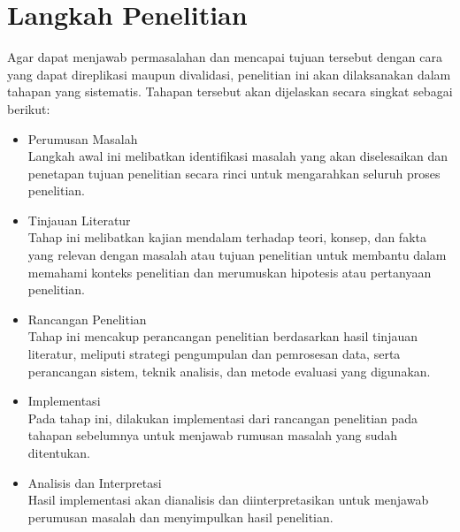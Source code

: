 \section{Langkah Penelitian}
\label{subbab:1:Langkah Penelitian}
Agar dapat menjawab permasalahan dan mencapai tujuan tersebut dengan cara yang dapat direplikasi maupun divalidasi, penelitian ini akan dilaksanakan dalam tahapan yang sistematis. Tahapan tersebut akan dijelaskan secara singkat sebagai berikut:
\begin{itemize}
    \item Perumusan Masalah \\
    Langkah awal ini melibatkan identifikasi masalah yang akan diselesaikan dan penetapan tujuan penelitian secara rinci untuk mengarahkan seluruh proses penelitian.
    
    \item Tinjauan Literatur \\
    Tahap ini melibatkan kajian mendalam terhadap teori, konsep, dan fakta yang relevan dengan masalah atau tujuan penelitian untuk membantu dalam memahami konteks penelitian dan merumuskan hipotesis atau pertanyaan penelitian.
    
    \item Rancangan Penelitian \\
    Tahap ini mencakup perancangan penelitian berdasarkan hasil tinjauan literatur, meliputi strategi pengumpulan dan pemrosesan data, serta perancangan sistem, teknik analisis, dan metode evaluasi yang digunakan.
    
    \item Implementasi \\
    Pada tahap ini, dilakukan implementasi dari rancangan penelitian pada tahapan sebelumnya untuk menjawab rumusan masalah yang sudah ditentukan.
    
    \item Analisis dan Interpretasi \\
    Hasil implementasi akan dianalisis dan diinterpretasikan untuk menjawab perumusan masalah dan menyimpulkan hasil penelitian.
\end{itemize}





